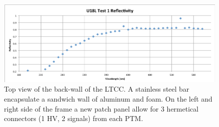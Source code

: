 \begin{figure}
	\centering
	\includegraphics[width=1.0\columnwidth,keepaspectratio]{img/winstoConeSample1Reflectivity.png}
	\caption{Top view of the back-wall of the LTCC. A stainless steel bar encapsulate a sandwich wall of aluminum and foam. On the left and right side
			of the frame a new patch panel allow for 3 hermetical connectors (1 HV, 2 signals) from each PTM. }
	\label{fig:wcReflectivitySamples}
\end{figure}

